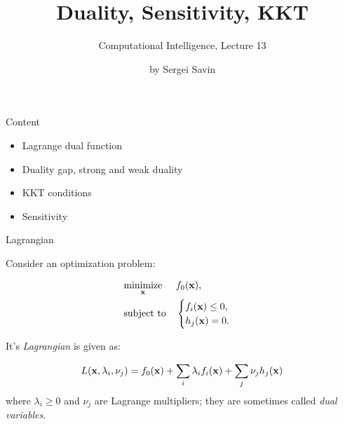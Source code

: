 \documentclass{beamer}
\title{Duality, Sensitivity, KKT}
\subtitle{Computational Intelligence, Lecture 13}
\author{by Sergei Savin}
\date{\mydate}
\begin{document}
\maketitle


\begin{frame}{Content}

\begin{itemize}
\item Lagrange dual function
\item Duality gap, strong and weak duality
\item KKT conditions
\item Sensitivity
\end{itemize}

\end{frame}







\begin{frame}{Lagrangian}
	\begin{flushleft}
		
		Consider an optimization problem:
		
		\begin{equation}
			\begin{aligned}
				& \underset{\mathbf{x}}{\text{minimize}}
				& & f_0(\mathbf{x}), \\
				& \text{subject to}
				& & \begin{cases}
					f_i(\mathbf{x}) \leq 0, \\
					h_j(\mathbf{x}) = 0.
				\end{cases}
			\end{aligned}
		\end{equation}
		
		It's \emph{Lagrangian} is given as:
		
		\begin{equation}
			L(\mathbf{x}, \lambda_i, \nu_j) = 
			f_0(\mathbf{x}) + 
			\sum\limits_i \lambda_i f_i(\mathbf{x}) +
			\sum\limits_j \nu_j h_j(\mathbf{x})
		\end{equation}
	where $\lambda_i \geq 0$ and $\nu_j$ are Lagrange multipliers; they are sometimes called \emph{dual variables}.
		
	\end{flushleft}
\end{frame}
\end{document}
